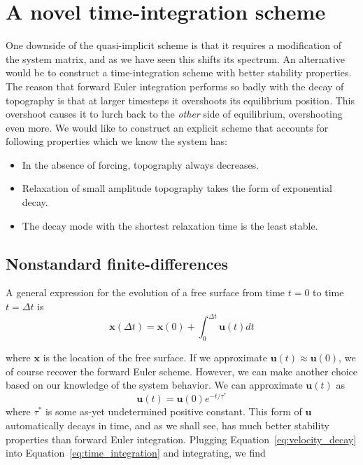 \documentclass[preprint,12pt,authoryear]{elsarticle}
\begin{document}
\section{A novel time-integration scheme}

One downside of the quasi-implicit scheme is that it requires a modification of the system matrix, 
and as we have seen this shifts its spectrum.
An alternative would be to construct a time-integration scheme with better stability properties.  
The reason that forward Euler integration performs so badly with the decay of topography is that 
at larger timesteps it overshoots its equilibrium position. This overshoot causes it to lurch back 
to the \emph{other} side of equilibrium, overshooting even more.
We would like to construct an explicit scheme that accounts for following properties which we know the system has:
\begin{itemize}
\item In the absence of forcing, topography always decreases.
\item Relaxation of small amplitude topography takes the form of exponential decay.
\item The decay mode with the shortest relaxation time is the least stable.
\end{itemize}

\subsection{Nonstandard finite-differences}

A general expression for the evolution of a free surface from time $t=0$ to time $t=\Delta t$ is 
\begin{equation}
\mathbf{x}(\Delta t) = \mathbf{x}(0) + \int_0^{\Delta t} \mathbf{u}(t) dt
\label{eq:time_integration}
\end{equation}

where $\mathbf{x}$ is the location of the free surface.  If we approximate $\mathbf{u}(t) \approx \mathbf{u}(0)$, 
we of course recover the forward Euler scheme.
However, we can make another choice based on our knowledge of the system behavior. 
We can approximate $\mathbf{u}(t)$ as
\begin{equation}
\mathbf{u}(t) = \mathbf{u}(0) e^{-t/\tau^*}
\label{eq:velocity_decay}
\end{equation}
where $\tau^*$ is some as-yet undetermined positive constant.
This form of $\mathbf{u}$ automatically decays in time, and as we shall see, has much better 
stability properties than forward Euler integration.
Plugging Equation~\eqref{eq:velocity_decay} into Equation~\eqref{eq:time_integration} and integrating, we find
\end{document}
